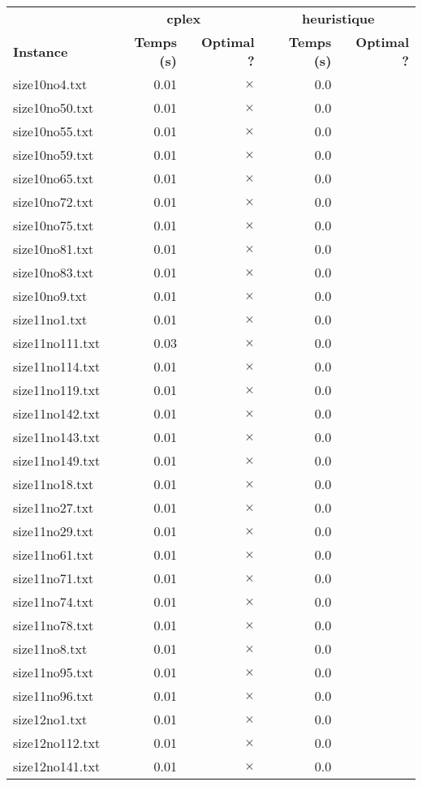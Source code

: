 \documentclass{article}
\begin{document}
\newpage
\begin{center}
\renewcommand{\arraystretch}{1.4} 
 \begin{tabular}{lrrrr}
	\hline
 & \multicolumn{2}{c}{\textbf{cplex}} & \multicolumn{2}{c}{\textbf{heuristique}}\\
\textbf{Instance}  & \textbf{Temps (s)} & \textbf{Optimal ?}  & \textbf{Temps (s)} & \textbf{Optimal ?} \\\hline

size10no4.txt & 0.01 & 
$\times$
 & 0.0 & 
\\
size10no50.txt & 0.01 & 
$\times$
 & 0.0 & 
\\
size10no55.txt & 0.01 & 
$\times$
 & 0.0 & 
\\
size10no59.txt & 0.01 & 
$\times$
 & 0.0 & 
\\
size10no65.txt & 0.01 & 
$\times$
 & 0.0 & 
\\
size10no72.txt & 0.01 & 
$\times$
 & 0.0 & 
\\
size10no75.txt & 0.01 & 
$\times$
 & 0.0 & 
\\
size10no81.txt & 0.01 & 
$\times$
 & 0.0 & 
\\
size10no83.txt & 0.01 & 
$\times$
 & 0.0 & 
\\
size10no9.txt & 0.01 & 
$\times$
 & 0.0 & 
\\
size11no1.txt & 0.01 & 
$\times$
 & 0.0 & 
\\
size11no111.txt & 0.03 & 
$\times$
 & 0.0 & 
\\
size11no114.txt & 0.01 & 
$\times$
 & 0.0 & 
\\
size11no119.txt & 0.01 & 
$\times$
 & 0.0 & 
\\
size11no142.txt & 0.01 & 
$\times$
 & 0.0 & 
\\
size11no143.txt & 0.01 & 
$\times$
 & 0.0 & 
\\
size11no149.txt & 0.01 & 
$\times$
 & 0.0 & 
\\
size11no18.txt & 0.01 & 
$\times$
 & 0.0 & 
\\
size11no27.txt & 0.01 & 
$\times$
 & 0.0 & 
\\
size11no29.txt & 0.01 & 
$\times$
 & 0.0 & 
\\
size11no61.txt & 0.01 & 
$\times$
 & 0.0 & 
\\
size11no71.txt & 0.01 & 
$\times$
 & 0.0 & 
\\
size11no74.txt & 0.01 & 
$\times$
 & 0.0 & 
\\
size11no78.txt & 0.01 & 
$\times$
 & 0.0 & 
\\
size11no8.txt & 0.01 & 
$\times$
 & 0.0 & 
\\
size11no95.txt & 0.01 & 
$\times$
 & 0.0 & 
\\
size11no96.txt & 0.01 & 
$\times$
 & 0.0 & 
\\
size12no1.txt & 0.01 & 
$\times$
 & 0.0 & 
\\
size12no112.txt & 0.01 & 
$\times$
 & 0.0 & 
\\
size12no141.txt & 0.01 & 
$\times$
 & 0.0 & 
\\
\hline\end{tabular}
\end{center}
\end{document}
